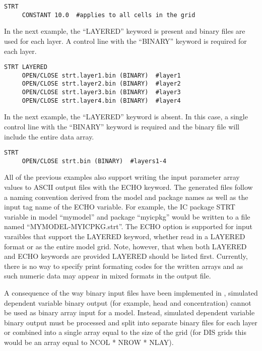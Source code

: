 \begin{lstlisting}[style=inputfile]
  STRT
     CONSTANT 10.0  #applies to all cells in the grid
\end{lstlisting}

In the next example, the ``LAYERED'' keyword is present and binary files are used for each layer. A control line with the ``BINARY'' keyword is required for each layer.

\begin{lstlisting}[style=inputfile]
  STRT LAYERED
     OPEN/CLOSE strt.layer1.bin (BINARY)  #layer1
     OPEN/CLOSE strt.layer2.bin (BINARY)  #layer2
     OPEN/CLOSE strt.layer3.bin (BINARY)  #layer3
     OPEN/CLOSE strt.layer4.bin (BINARY)  #layer4
\end{lstlisting}

In the next example, the ``LAYERED'' keyword is absent. In this case, a single control line with the ``BINARY'' keyword is required and the binary file will include the entire data array.

\begin{lstlisting}[style=inputfile]
  STRT
     OPEN/CLOSE strt.bin (BINARY)  #layers1-4
\end{lstlisting}

All of the previous examples also support writing the input parameter array values to ASCII output files with the ECHO keyword.  The generated files follow a naming convention derived from the model and package names as well as the input tag name of the ECHO variable.  For example, the IC package STRT variable in model ``mymodel'' and package ``myicpkg'' would be written to a file named ``MYMODEL-MYICPKG.strt''.  The ECHO option is supported for input varaibles that support the LAYERED keyword, whether read in a LAYERED format or as the entire model grid.  Note, however, that when both LAYERED and ECHO keywords are provided LAYERED should be listed first.  Currently, there is no way to specify print formating codes for the written arrays and as such numeric data may appear in mixed formats in the output file.

A consequence of the way binary input files have been implemented in \mf, simulated dependent variable binary output (for example, head and concentration) cannot be used as binary array input for a model. Instead, simulated dependent variable binary output must be processed and split into separate binary files for each layer or combined into a single array equal to the size of the grid (for DIS grids this would be an array equal to NCOL * NROW * NLAY).
